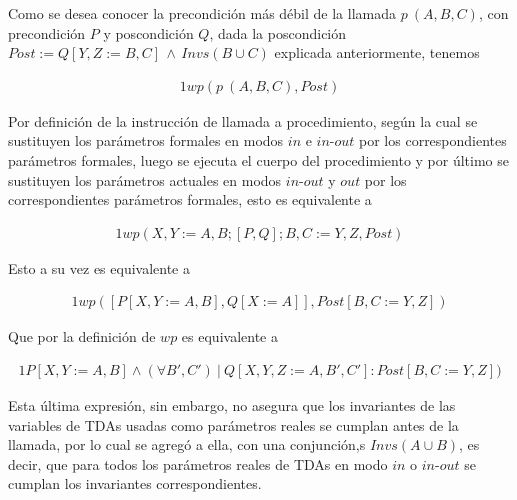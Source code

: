 Como se desea conocer la precondición más débil de la llamada $p\  (A,B,C)$, con precondición $P$ y poscondición $Q$, dada la poscondición $Post := Q[Y,Z:=B,C]\, \land \, Invs(B \cup C)$ explicada anteriormente, tenemos

\begin{alignat}{1}
wp(p\  (A,B,C), Post)
\end{alignat}

Por definición de la instrucción de llamada a procedimiento, según la cual se sustituyen los parámetros formales en modos $in$ e $in\textrm{-}out$ por los correspondientes parámetros formales, luego se ejecuta el
cuerpo del procedimiento y por último se sustituyen los parámetros
actuales en modos $in\textrm{-}out$ y $out$ por los correspondientes parámetros formales, esto es equivalente a

\begin{alignat}{1}
wp(X,Y := A,B; [P,Q]; B,C := Y,Z, Post)
\end{alignat}

Esto a su vez es equivalente a

\begin{alignat}{1}
wp([P[X,Y := A,B],Q[X:=A]], Post[B,C := Y,Z])
\end{alignat}

Que por la definición de $wp$ es equivalente a

\begin{alignat}{1}
P[X,Y := A,B] \land (\forall B', C')\ |\ Q[X,Y,Z:=A,B',C'] : Post[B,C := Y,Z])
\end{alignat}

Esta última expresión, sin embargo, no asegura que los invariantes de
las variables de TDAs usadas como parámetros reales se cumplan antes de la llamada, por lo cual se agregó a ella, con una conjunción,s $Invs(A \cup B)$, es decir, que para todos los parámetros reales de TDAs en modo 
$in$ o $in\textrm{-}out$ se cumplan los invariantes correspondientes.
